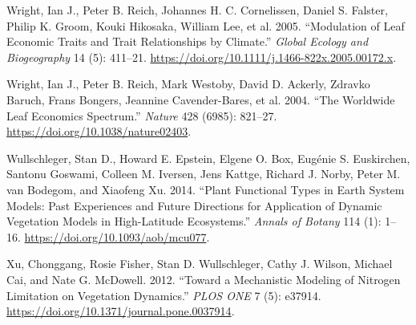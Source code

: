 \documentclass[
  letterpaper,
  DIV=11,
  numbers=noendperiod]{scrartcl}
\newlength{\cslhangindent}
\newlength{\cslentryspacingunit} %
\newenvironment{CSLReferences}[2] %
 {%
  \setlength{\parindent}{0pt}
  \ifodd #1
  \let\oldpar\par
  \def\par{\hangindent=\cslhangindent\oldpar}
  \fi
  \setlength{\parskip}{#2\cslentryspacingunit}
 }%
 {}
\begin{document}
\begin{CSLReferences}{1}{0}
\leavevmode{}%
Wright, Ian J., Peter B. Reich, Johannes H. C. Cornelissen, Daniel S.
Falster, Philip K. Groom, Kouki Hikosaka, William Lee, et al. 2005.
{``Modulation of Leaf Economic Traits and Trait Relationships by
Climate.''} \emph{Global Ecology and Biogeography} 14 (5): 411--21.
\url{https://doi.org/10.1111/j.1466-822x.2005.00172.x}.

\leavevmode{}%
Wright, Ian J., Peter B. Reich, Mark Westoby, David D. Ackerly, Zdravko
Baruch, Frans Bongers, Jeannine Cavender-Bares, et al. 2004. {``The
Worldwide Leaf Economics Spectrum.''} \emph{Nature} 428 (6985): 821--27.
\url{https://doi.org/10.1038/nature02403}.

\leavevmode{}%
Wullschleger, Stan D., Howard E. Epstein, Elgene O. Box, Eugénie S.
Euskirchen, Santonu Goswami, Colleen M. Iversen, Jens Kattge, Richard J.
Norby, Peter M. van Bodegom, and Xiaofeng Xu. 2014. {``Plant Functional
Types in Earth System Models: Past Experiences and Future Directions for
Application of Dynamic Vegetation Models in High-Latitude Ecosystems.''}
\emph{Annals of Botany} 114 (1): 1--16.
\url{https://doi.org/10.1093/aob/mcu077}.

\leavevmode{}%
Xu, Chonggang, Rosie Fisher, Stan D. Wullschleger, Cathy J. Wilson,
Michael Cai, and Nate G. McDowell. 2012. {``Toward a Mechanistic
Modeling of Nitrogen Limitation on Vegetation Dynamics.''} \emph{PLOS
ONE} 7 (5): e37914. \url{https://doi.org/10.1371/journal.pone.0037914}.

\end{CSLReferences}
\end{document}
